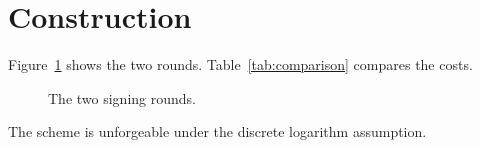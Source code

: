 \section{Construction}\label{sec:construction}
Figure~\ref{fig:protocol} shows the two rounds. Table~\ref{tab:comparison} compares the costs.
\begin{figure}[t]
  \centering
  \caption{The two signing rounds.}\label{fig:protocol}
\end{figure}

\begin{theorem}\label{thm:unforgeable}
The scheme is unforgeable under the discrete logarithm assumption.
\end{theorem}
